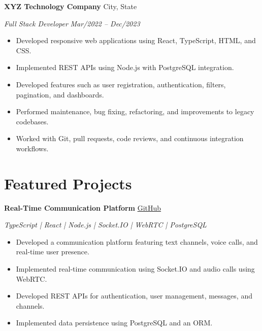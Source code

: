 \documentclass[a4paper,10pt]{article}
\begin{document}
\vspace{0.01cm}

\textbf{XYZ Technology Company}
\hfill
City, State

\textit{Full Stack Developer}
\hfill
\textit{Mar/2022 -- Dec/2023}

\begin{itemize}

    \item Developed responsive web applications using React, TypeScript, HTML, and CSS.

    \item Implemented REST APIs using Node.js with PostgreSQL integration.

    \item Developed features such as user registration, authentication, filters, pagination, and dashboards.

    \item Performed maintenance, bug fixing, refactoring, and improvements to legacy codebases.

    \item Worked with Git, pull requests, code reviews, and continuous integration workflows.

\end{itemize}


\section{Featured Projects}

\textbf{Real-Time Communication Platform}
\hfill
\href{https://github.com/username/project}{GitHub}

\textit{TypeScript | React | Node.js | Socket.IO | WebRTC | PostgreSQL}

\begin{itemize}

    \item Developed a communication platform featuring text channels, voice calls, and real-time user presence.

    \item Implemented real-time communication using Socket.IO and audio calls using WebRTC.

    \item Developed REST APIs for authentication, user management, messages, and channels.

    \item Implemented data persistence using PostgreSQL and an ORM.

\end{itemize}
\end{document}
